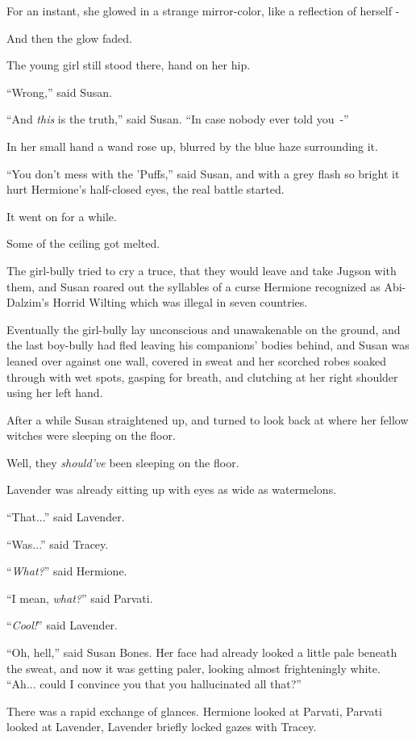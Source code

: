 For an instant, she glowed in a strange mirror-color, like a reflection of herself -

And then the glow faded.

The young girl still stood there, hand on her hip.

``Wrong,'' said Susan.

``And \emph{this} is the truth,'' said Susan. ``In case nobody ever told you~-''

In her small hand a wand rose up, blurred by the blue haze surrounding it.

``You don't mess with the 'Puffs,'' said Susan, and with a grey flash so bright it hurt Hermione's half-closed eyes, the real battle started.

It went on for a while.

Some of the ceiling got melted.

The girl-bully tried to cry a truce, that they would leave and take Jugson with them, and Susan roared out the syllables of a curse Hermione recognized as Abi-Dalzim's Horrid Wilting which was illegal in seven countries.

Eventually the girl-bully lay unconscious and unawakenable on the ground, and the last boy-bully had fled leaving his companions' bodies behind, and Susan was leaned over against one wall, covered in sweat and her scorched robes soaked through with wet spots, gasping for breath, and clutching at her right shoulder using her left hand.

After a while Susan straightened up, and turned to look back at where her fellow witches were sleeping on the floor.

Well, they \emph{should've} been sleeping on the floor.

Lavender was already sitting up with eyes as wide as watermelons.

``That...'' said Lavender.

``Was...'' said Tracey.

``\emph{What?}'' said Hermione.

``I mean, \emph{what?}'' said Parvati.

``\emph{Cool!}'' said Lavender.

``Oh, hell,'' said Susan Bones. Her face had already looked a little pale beneath the sweat, and now it was getting paler, looking almost frighteningly white. ``Ah... could I convince you that you hallucinated all that?''

There was a rapid exchange of glances. Hermione looked at Parvati, Parvati looked at Lavender, Lavender briefly locked gazes with Tracey.

